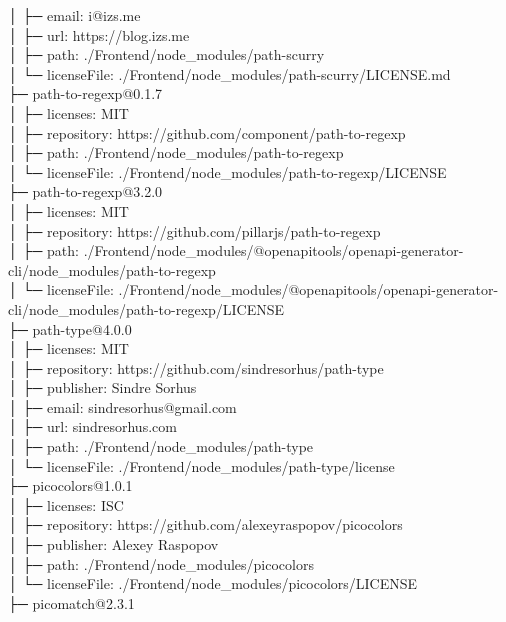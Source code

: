 \documentclass[
    paper=a4,
    twoside=false,
    parskip=half,
    listof=entryprefix,
    listof=totoc,
    index=totoc,
    bibliography=totoc,
    headsepline,
]{scrbook}
\begin{document}
    │  ├─ email: i@izs.me\\
    │  ├─ url: https://blog.izs.me\\
    │  ├─ path: ./Frontend/node\_modules/path-scurry\\
    │  └─ licenseFile: ./Frontend/node\_modules/path-scurry/LICENSE.md\\
    ├─ path-to-regexp@0.1.7\\
    │  ├─ licenses: MIT\\
    │  ├─ repository: https://github.com/component/path-to-regexp\\
    │  ├─ path: ./Frontend/node\_modules/path-to-regexp\\
    │  └─ licenseFile: ./Frontend/node\_modules/path-to-regexp/LICENSE\\
    ├─ path-to-regexp@3.2.0\\
    │  ├─ licenses: MIT\\
    │  ├─ repository: https://github.com/pillarjs/path-to-regexp\\
    │  ├─ path: ./Frontend/node\_modules/@openapitools/openapi-generator-cli/node\_modules/path-to-regexp\\
    │  └─ licenseFile: ./Frontend/node\_modules/@openapitools/openapi-generator-cli/node\_modules/path-to-regexp/LICENSE\\
    ├─ path-type@4.0.0\\
    │  ├─ licenses: MIT\\
    │  ├─ repository: https://github.com/sindresorhus/path-type\\
    │  ├─ publisher: Sindre Sorhus\\
    │  ├─ email: sindresorhus@gmail.com\\
    │  ├─ url: sindresorhus.com\\
    │  ├─ path: ./Frontend/node\_modules/path-type\\
    │  └─ licenseFile: ./Frontend/node\_modules/path-type/license\\
    ├─ picocolors@1.0.1\\
    │  ├─ licenses: ISC\\
    │  ├─ repository: https://github.com/alexeyraspopov/picocolors\\
    │  ├─ publisher: Alexey Raspopov\\
    │  ├─ path: ./Frontend/node\_modules/picocolors\\
    │  └─ licenseFile: ./Frontend/node\_modules/picocolors/LICENSE\\
    ├─ picomatch@2.3.1\\
\end{document}

